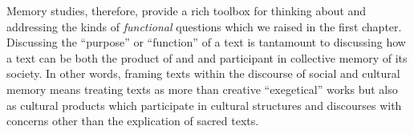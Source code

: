 Memory studies, therefore, provide a rich toolbox for thinking about and addressing the kinds of \emph{functional} questions which we raised in the first chapter. Discussing the ``purpose'' or ``function'' of a text is tantamount to discussing how a text can be both the product of and and participant in collective memory of its society. In other words, framing \rwb texts within the discourse of social and cultural memory means treating \rwb texts as more than creative ``exegetical'' works but also as cultural products which participate in cultural structures and discourses with concerns other than the explication of sacred texts.